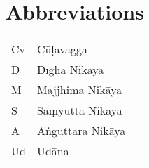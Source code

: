 \chapter*{Abbreviations}

\begin{tabular}{l l}
Cv & Cūḷavagga\\
D & Dīgha Nikāya\\
M & Majjhima Nikāya\\
S & Saṃyutta Nikāya\\
A & Aṅguttara Nikāya\\
Ud & Udāna\\
\end{tabular}
